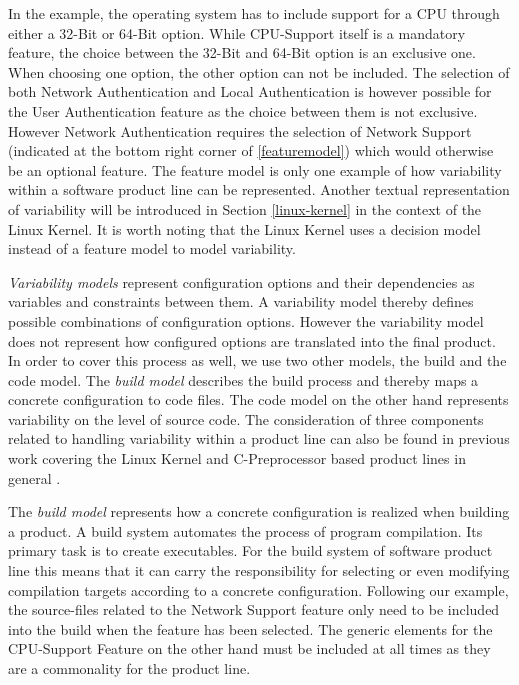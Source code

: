 \documentclass[a4paper]{article}
\begin{document}
In the example, the operating system has to include support for a CPU through either a 32-Bit or 64-Bit option. While CPU-Support itself is a mandatory feature, the choice between the 32-Bit and 64-Bit option is an exclusive one. When choosing one option, the other option can not be included. The selection of both Network Authentication and Local Authentication is however possible for the User Authentication feature as the choice between them is not exclusive. However Network Authentication requires the selection of Network Support (indicated at the bottom right corner of \autoref{featuremodel}) which would otherwise be an optional feature. The feature model is only one example of how variability within a software product line can be represented. Another textual representation of variability will be introduced in Section \ref{linux-kernel} in the context of the Linux Kernel. It is worth noting that the Linux Kernel uses a decision model instead of a feature model to model variability.

\emph{Variability models} represent configuration options and their dependencies as variables and constraints between them. A variability model thereby defines possible combinations of configuration options. However the variability model does not represent how configured options are translated into the final product. In order to cover this process as well, we use two other models, the build and the code model. The \emph{build model} describes the build process and thereby maps a concrete configuration to code files. The code model on the other hand represents variability on the level of source code. The consideration of three components related to handling variability within a product line can also be found in previous work covering the Linux Kernel  \cite{nadi-linux-kernel} \cite{mining-kbuild} and C-Preprocessor based product lines in general \cite{KroeherEl-SharkawySchmid18}.

The \emph{build model} represents how a concrete configuration is realized when building a product. A build system automates the process of program compilation. Its primary task is to create executables. For the build system of software product line this means that it can carry the responsibility for selecting or even modifying compilation targets according to a concrete configuration. Following our example, the source-files related to the Network Support feature only need to be included into the build when the feature has been selected. The generic elements for the CPU-Support Feature on the other hand must be included at all times as they are a commonality for the product line. 
\end{document}
